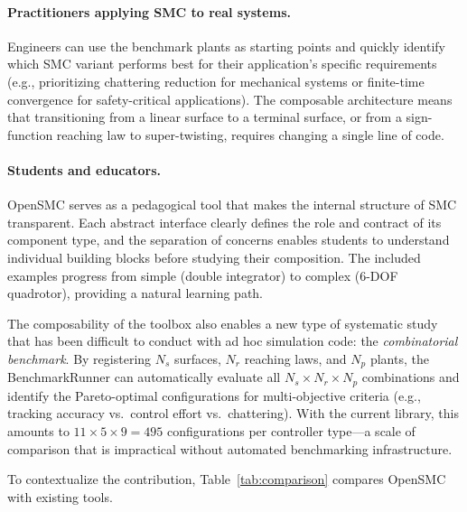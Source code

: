 \documentclass[preprint,12pt]{elsarticle}
\begin{document}
\paragraph{Practitioners applying SMC to real systems.} Engineers can use the benchmark plants as starting points and quickly identify which SMC variant performs best for their application's specific requirements (e.g., prioritizing chattering reduction for mechanical systems or finite-time convergence for safety-critical applications). The composable architecture means that transitioning from a linear surface to a terminal surface, or from a sign-function reaching law to super-twisting, requires changing a single line of code.

\paragraph{Students and educators.} OpenSMC serves as a pedagogical tool that makes the internal structure of SMC transparent. Each abstract interface clearly defines the role and contract of its component type, and the separation of concerns enables students to understand individual building blocks before studying their composition. The included examples progress from simple (double integrator) to complex (6-DOF quadrotor), providing a natural learning path.

The composability of the toolbox also enables a new type of systematic study that has been difficult to conduct with ad hoc simulation code: the \emph{combinatorial benchmark}. By registering $N_s$ surfaces, $N_r$ reaching laws, and $N_p$ plants, the BenchmarkRunner can automatically evaluate all $N_s \times N_r \times N_p$ combinations and identify the Pareto-optimal configurations for multi-objective criteria (e.g., tracking accuracy vs.\ control effort vs.\ chattering). With the current library, this amounts to $11 \times 5 \times 9 = 495$ configurations per controller type---a scale of comparison that is impractical without automated benchmarking infrastructure.

To contextualize the contribution, Table~\ref{tab:comparison} compares OpenSMC with existing tools.
\end{document}
